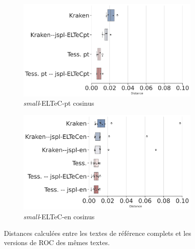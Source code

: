 \begin{figure}[h!]
    \begin{subfigure}{0.45\textwidth}
    \hspace{-0.9cm}
  \includegraphics[height=.58\textwidth]{REVUETAL_article_23102023/IMAGES/Boite-a_moustache_12072024/ELTeC_Por_spaCy3.5.1/ELTeC_Por_spaCy3.5.1-cosinus-sim2-3.png} 
        \caption{\textit{small}-ELTeC-pt cosinus}
        \label{fig:ELTeC-Por_REF_cosinus}
   \end{subfigure}   
         \begin{subfigure}{0.45\textwidth}
  \includegraphics[height=.58\textwidth]{REVUETAL_article_23102023/IMAGES/Boite-a_moustache_12072024/ELTeC_eng_spaCy3.5.1/ELTeC_eng_spaCy3.5.1-cosinus-sim2-3.png} 
        \caption{\textit{small}-ELTeC-en cosinus}
   \end{subfigure}   
    \caption{Distances calculées entre les textes de référence complets et les versions de ROC des mêmes textes.}
    \label{fig:distances_ref_roc}
\end{figure}

